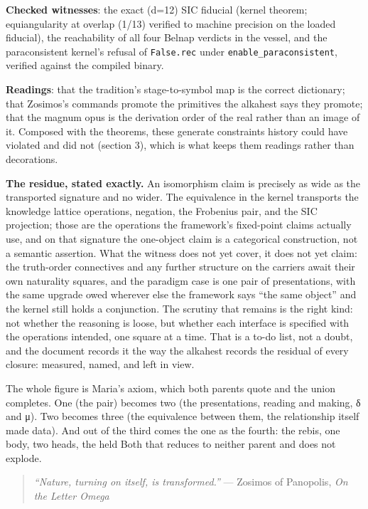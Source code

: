 \textbf{Checked witnesses}: the exact (d=12) SIC fiducial (kernel
theorem; equiangularity at overlap (1/13) verified to machine precision
on the loaded fiducial), the reachability of all four Belnap verdicts in
the vessel, and the paraconsistent kernel's refusal of
\texttt{False.rec} under \texttt{enable\_paraconsistent}, verified
against the compiled binary.

\textbf{Readings}: that the tradition's stage-to-symbol map is the
correct dictionary; that Zosimos's commands promote the primitives the
alkahest says they promote; that the magnum opus is the derivation order
of the real rather than an image of it. Composed with the theorems,
these generate constraints history could have violated and did not
(section 3), which is what keeps them readings rather than decorations.

\textbf{The residue, stated exactly.} An isomorphism claim is precisely
as wide as the transported signature and no wider. The equivalence in
the kernel transports the knowledge lattice operations, negation, the
Frobenius pair, and the SIC projection; those are the operations the
framework's fixed-point claims actually use, and on that signature the
one-object claim is a categorical construction, not a semantic
assertion. What the witness does not yet cover, it does not yet claim:
the truth-order connectives and any further structure on the carriers
await their own naturality squares, and the paradigm case is one pair of
presentations, with the same upgrade owed wherever else the framework
says ``the same object'' and the kernel still holds a conjunction. The
scrutiny that remains is the right kind: not whether the reasoning is
loose, but whether each interface is specified with the operations
intended, one square at a time. That is a to-do list, not a doubt, and
the document records it the way the alkahest records the residual of
every closure: measured, named, and left in view.

The whole figure is Maria's axiom, which both parents quote and the
union completes. One (the pair) becomes two (the presentations, reading
and making, δ and μ). Two becomes three (the equivalence between them,
the relationship itself made data). And out of the third comes the one
as the fourth: the rebis, one body, two heads, the held Both that
reduces to neither parent and does not explode.

\begin{quote}
\emph{``Nature, turning on itself, is transformed.''} --- Zosimos of
Panopolis, \emph{On the Letter Omega}
\end{quote}

